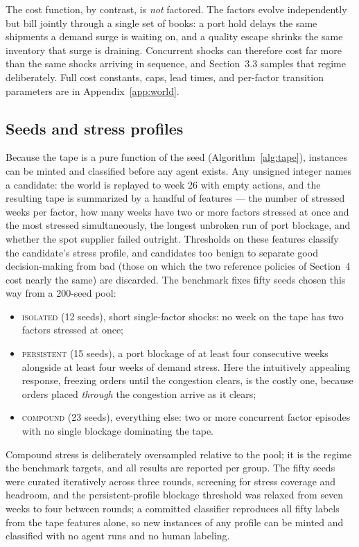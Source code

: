 \documentclass{article}
\begin{document}
The cost function, by contrast, is \emph{not} factored. The factors
evolve independently but bill jointly through a single set of books: a
port hold delays the same shipments a demand surge is waiting on, and a
quality escape shrinks the same inventory that surge is draining.
Concurrent shocks can therefore cost far more than the same shocks
arriving in sequence, and Section~3.3 samples that regime deliberately.
Full cost constants, caps, lead times, and per-factor transition
parameters are in Appendix~\ref{app:world}.

\subsection{Seeds and stress profiles}

Because the tape is a pure function of the seed
(Algorithm~\ref{alg:tape}), instances can be minted and classified
before any agent exists. Any unsigned integer names a candidate: the
world is replayed to week 26 with empty actions, and the resulting tape
is summarized by a handful of features --- the number of stressed weeks
per factor, how many weeks have two or more factors stressed at once and
the most stressed simultaneously, the longest unbroken run of port
blockage, and whether the spot supplier failed outright. Thresholds on
these features classify the candidate's stress profile, and candidates
too benign to separate good decision-making from bad (those on which the
two reference policies of Section~4 cost nearly the same) are discarded.
The benchmark fixes fifty seeds chosen this way from a 200-seed pool:
\begin{itemize}
  \item \textsc{isolated} (12 seeds), short single-factor shocks: no
        week on the tape has two factors stressed at once;
  \item \textsc{persistent} (15 seeds), a port blockage of at least four
        consecutive weeks alongside at least four weeks of demand
        stress. Here the intuitively appealing response, freezing orders
        until the congestion clears, is the costly one, because orders
        placed \emph{through} the congestion arrive as it clears;
  \item \textsc{compound} (23 seeds), everything else: two or more
        concurrent factor episodes with no single blockage dominating
        the tape.
\end{itemize}
Compound stress is deliberately oversampled relative to the pool; it is the
regime the benchmark targets, and all results are reported per group.
The fifty seeds were curated iteratively across three rounds, screening
for stress coverage and headroom, and the persistent-profile blockage
threshold was relaxed from seven weeks to four between rounds; a
committed classifier reproduces all fifty labels from the tape features
alone, so new instances of any profile can be minted and classified with
no agent runs and no human labeling.
\end{document}
